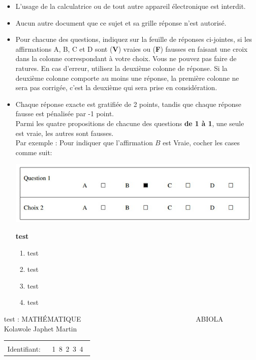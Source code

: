 \documentclass{book}%
\begin{document}
\begin{itemize}%
\item%
L'usage de la calculatrice ou de tout autre appareil électronique est interdit.%
\item%
Aucun autre document que ce sujet et sa grille réponse n'est autorisé.%
\item%
Pour chacune des questions, indiquez sur la feuille de réponses ci-jointes, si les affirmations A, B, C et D sont (\textbf{V}) vraies ou (\textbf{F}) fausses en faisant une croix dans la colonne correspondant à votre choix. Vous ne pouvez pas faire de ratures. En cas d'erreur, utilisez la deuxième colonne de réponse. Si la deuxième colonne comporte au moins une réponse, la première colonne ne sera pas corrigée, c'est la deuxième qui sera prise en considération.%
\item%
Chaque réponse exacte est gratifiée de 2 points, tandis que chaque réponse fausse est pénalisée par -1 point. \\ 	Parmi les quatre propositions de chacune des questions \textbf{de 1 à 1}, une seule est vraie, les autres sont fausses. \\ 	Par exemple : Pour indiquer que l'affirmation $B$ est Vraie, cocher les cases comme suit:  \\ \begin{center}	\includegraphics[scale=0.8]{reponses.png} \end{center}%
\thispagestyle{empty}%
\begin{exercise}%
\textbf{test }%
\begin{enumerate}[label=\textbf{\Alph*. }]%
\item%
test%
\item%
test%
\item%
test%
\item%
test%
\end{enumerate}%
\end{exercise}%
\end{itemize}%
\newpage%
\thispagestyle{empty}%
test : MATHÉMATIQUE $\qquad \qquad \qquad \qquad \qquad \qquad \qquad \qquad$ ABIOLA Kolawole Japhet Martin%
\begin{flushright}%
\begin{tabular}{|l|}%
\hline%
 \\%
\thispagestyle{empty}%
Identifiant: $\quad$ {\Large 1~8~2~3~4~}%
 \\%
\hline%
\end{tabular}%
\end{flushright}%
\end{document}
